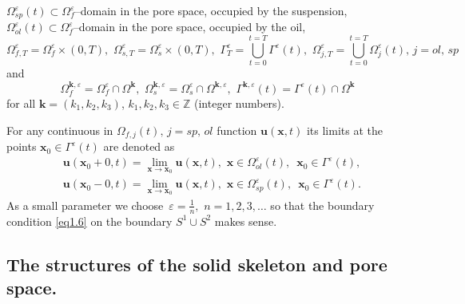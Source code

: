 \documentclass{article}
\theoremstyle{plain}
\theoremstyle{definition}
\numberwithin{equation}{section}
\begin{document}
$\Omega^{\varepsilon}_{sp}(t)\subset\Omega^{\varepsilon}_{f}$--domain in the pore space, occupied by the suspension,
$\Omega^{\varepsilon}_{ol}(t)\subset\Omega^{\varepsilon}_{f}$--domain in the pore space, occupied by the oil,
\begin{equation*}
\Omega^{\varepsilon}_{f,T}=\Omega^{\varepsilon}_{f}\times(0,T),\,\,
\Omega^{\varepsilon}_{s,T}=\Omega^{\varepsilon}_{s}\times(0,T),\,\,
\Gamma^{\varepsilon}_{T}=\bigcup_{t=0}^{t=T}\Gamma^{\varepsilon}(t),\,\,
\Omega^{\varepsilon}_{j,T}=\bigcup_{t=0}^{t=T}\Omega^{\varepsilon}_{j}(t),\,j=ol,\,sp
\end{equation*}
and
\begin{equation*}
\Omega_{f}^{\boldsymbol{k},\varepsilon}=\Omega^{\varepsilon}_{f}\cap{\Omega}^{\boldsymbol{k}},\,\,
\Omega_{s}^{\boldsymbol{k},\varepsilon}=
\Omega^{\varepsilon}_{s}\cap{\Omega}^{\boldsymbol{k},\varepsilon},\,\,
\Gamma^{\boldsymbol{k},\varepsilon}(t)=\Gamma^{\varepsilon}(t)\cap{\Omega}^{\boldsymbol{k}}
\end{equation*}
for all $\boldsymbol{k}=(k_{1},k_{2},k_{3})$, $k_{1},k_{2},k_{3}\in \mathbb{Z}$ (integer numbers).

For any continuous in $\Omega_{f,j}(t),\,j=sp,\,ol$ function $\boldsymbol{u}(\boldsymbol{x},t)$ its limits at the points $\boldsymbol{x}_{0}\in\Gamma^{\varepsilon}(t)$ are denoted as
\begin{equation*}
\begin{aligned}
& 
\boldsymbol{u}(\boldsymbol{x}_{0}+0,t)=
\lim_{\boldsymbol{x}\rightarrow \boldsymbol{x}_{0}}\boldsymbol{u}(\boldsymbol{x},t),
\,\,\boldsymbol{x}\in \Omega^{\varepsilon}_{ol}(t),\,\,\,
\boldsymbol{x}_{0}\in \Gamma^{\varepsilon}(t),
\\
& \boldsymbol{u}(\boldsymbol{x}_{0}-0,t)=\lim_{\boldsymbol{x}\rightarrow
\boldsymbol{x}_{0}}\boldsymbol{u}(\boldsymbol{x},t),\,\,
\boldsymbol{x}\in \Omega^{\varepsilon}_{sp}(t),\,\,\,\boldsymbol{x}_{0}\in \Gamma^{\varepsilon}(t).
\end{aligned}
\end{equation*}
As a small parameter we choose $\displaystyle\,\varepsilon=\frac{1}{n},\,\, n=1,2,3,\ldots$ so that the boundary condition \eqref{eq1.6} on the boundary ${S}^{1}\cup{S}^{2}$ makes sense.

\subsection{The structures of the solid skeleton and pore space.}
\end{document}

